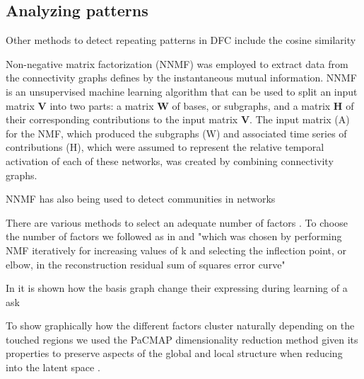 \subsection{Analyzing patterns}


Other methods to detect repeating patterns in DFC include the cosine similarity \cite{Menon2019comparisonstaticdynamic}

Non-negative matrix factorization (NNMF) \cite{Fu2019Nonnegativematrixfactorization} was employed to extract data from the connectivity graphs defines by the instantaneous mutual information. NNMF is an unsupervised machine learning algorithm that can be used to split an input matrix $\bm{V}$ into two parts: a matrix $\bm{W}$ of bases, or subgraphs, and a matrix $\bm{H}$ of their corresponding contributions to the input matrix $\bm{V}$. The input matrix (A) for the NMF, which produced the subgraphs (W) and associated time series of contributions (H), which were assumed to represent the relative temporal activation of each of these networks, was created by combining connectivity graphs.

NNMF has also being used to detect communities in networks \cite{Wang2011Communitydiscoveryusing,Luo2021Symmetricnonnegativematrix}


There are various methods to select an adequate number of factors \cite{Muzzarelli2019RankSelectionNon}. To choose the number of factors we followed as in \cite{Phalen2020Nonnegativematrix} and "which was chosen by performing NMF iteratively for increasing values of k and selecting the inflection point, or elbow, in the reconstruction residual sum of squares
error curve"

In \cite{Stiso2020Learningbraincomputer} it is shown how the basis graph change their expressing during learning of a ask


To show graphically how the different factors cluster naturally depending on the touched regions we used the PaCMAP dimensionality reduction method \cite{Wang2021Understandinghowdimension} given its properties to preserve aspects of the global and local structure when reducing into the latent space \cite{Huang2022Towardscomprehensiveevaluation}.

